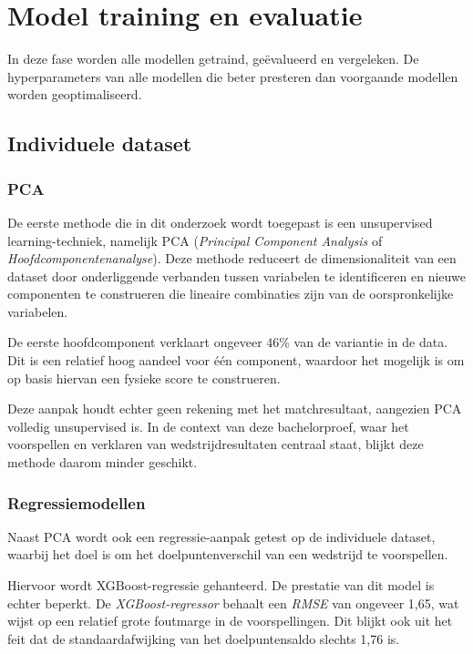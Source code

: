 \section{Model training en evaluatie}

In deze fase worden alle modellen getraind, geëvalueerd en vergeleken. De hyperparameters van alle modellen die beter presteren dan voorgaande modellen worden geoptimaliseerd.

\subsection{Individuele dataset}
\subsubsection{PCA}

De eerste methode die in dit onderzoek wordt toegepast is een unsupervised learning-techniek, namelijk PCA (\emph{Principal Component Analysis} of \emph{Hoofdcomponentenanalyse}). Deze methode reduceert de dimensionaliteit van een dataset door onderliggende verbanden tussen variabelen te identificeren en nieuwe componenten te construeren die lineaire combinaties zijn van de oorspronkelijke variabelen.

De eerste hoofdcomponent verklaart ongeveer 46\% van de variantie in de data. Dit is een relatief hoog aandeel voor één component, waardoor het mogelijk is om op basis hiervan een fysieke score te construeren.

Deze aanpak houdt echter geen rekening met het matchresultaat, aangezien PCA volledig unsupervised is. In de context van deze bachelorproef, waar het voorspellen en verklaren van wedstrijdresultaten centraal staat, blijkt deze methode daarom minder geschikt.

\subsubsection{Regressiemodellen}

Naast PCA wordt ook een regressie-aanpak getest op de individuele dataset, waarbij het doel is om het doelpuntenverschil van een wedstrijd te voorspellen.

Hiervoor wordt XGBoost-regressie gehanteerd. De prestatie van dit model is echter beperkt. De \emph{XGBoost-regressor} behaalt een \emph{RMSE} van ongeveer 1,65, wat wijst op een relatief grote foutmarge in de voorspellingen. Dit blijkt ook uit het feit dat de standaardafwijking van het doelpuntensaldo slechts 1,76 is.

